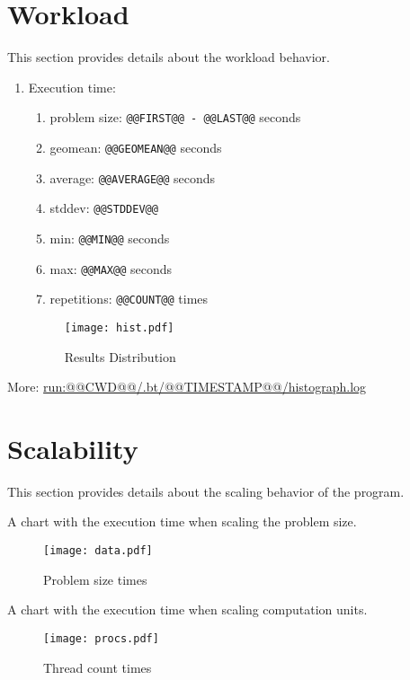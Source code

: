 \documentclass[a4paper]{article}
\begin{document}
\section{Workload}

This section provides details about the workload behavior.

\begin{enumerate}
\item Execution time:
\begin{enumerate}
\item problem size: {\tt @@FIRST@@ - @@LAST@@} seconds
\item geomean: {\tt @@GEOMEAN@@} seconds
\item average: {\tt @@AVERAGE@@} seconds
\item stddev: {\tt @@STDDEV@@}
\item min: {\tt @@MIN@@} seconds
\item max: {\tt @@MAX@@} seconds
\item repetitions: {\tt @@COUNT@@} times
\end{enumerate}

\begin{figure}[H]
\label{fig:histogram}
\centering
\texttt{[image: hist.pdf]}
\caption{Results Distribution}
\end{figure}

\end{enumerate}

More: \url{run:@@CWD@@/.bt/@@TIMESTAMP@@/histograph.log}

\section{Scalability}

This section provides details about the scaling behavior of the program.

A chart with the execution time when scaling the problem size.

\begin{figure}[H]
\label{fig:scaling}
\centering
\texttt{[image: data.pdf]}
\caption{Problem size times}
\end{figure}

A chart with the execution time when scaling computation units.

\begin{figure}[H]
\label{fig:threads}
\centering
\texttt{[image: procs.pdf]}
\caption{Thread count times}
\end{figure}
\end{document}
